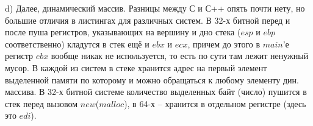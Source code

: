 \documentclass[a4paper,12pt]{article}
\begin{document}
d) Далее, динамический массив. Разницы между С и С++ опять почти нету, но большие отличия в листингах для различных систем.  В 32-х битной перед и после пуша регистров, указывающих на вершину и дно стека ($esp$ и $ebp$ соответственно) кладутся в стек ещё и $ebx$ и $ecx$, причем до этого в $main$'е регистр $ebx$ вообще никак не используется, то есть по сути там лежит ненужный мусор. В каждой из систем в стеке хранится адрес на первый элемент выделенной памяти по которому и можно обращаться к любому элементу дин. массива. В 32-х битной системе количество выделенных байт (число) пушится в стек перед вызовом $new$($malloc$), в 64-х -- хранится в отдельном регистре (здесь это $edi$).   
\begin{figure}[H]\label{fig: 2гCpp32 and 2гCpp64}
\end{figure}
\end{document}

